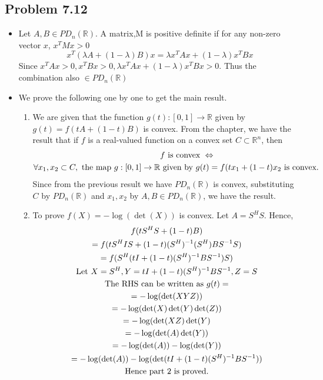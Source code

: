 \documentclass[letterpaper,12pt]{article}
\theoremstyle{definition}
\begin{document}
\subsection*{Problem 7.12}
\begin{itemize}
    \item Let $ A,B \in PD_n(\mathbb{R})$. A matrix,M is positive definite if for any non-zero vector $x$, $ x^TMx>0 $
    \begin{equation*}
        x^T(\lambda A + (1-\lambda)B)x = \lambda x^TAx + (1-\lambda)x^TBx
    \end{equation*}
    Since $x^TAx > 0, x^TBx >0, \lambda x^TAx + (1-\lambda)x^TBx > 0 $. Thus the combination also $\in PD_n(\mathbb{R})$
    
    \item We prove the following one by one to get the main result.
    \begin{enumerate}
    \item We are given that the function $g(t): [0,1] \rightarrow \mathbb{R}$ given by $g(t) = f(tA + (1-t)B)$ is convex. 
    From the chapter, we have the result that if $f$ is a real-valued function on a convex set $C \subset \mathbb{R}^n$, then
    \begin{align*}
        &f \textnormal{ is convex } \Leftrightarrow \\
        \forall x_1, x_2 \subset C, \textnormal{ the map } g: [0,1] \rightarrow \mathbb{R}&\textnormal{ given by } g(t) = f(tx_1 + (1-t)x_2 \textnormal{ is convex.} \\
    \end{align*}
    Since from the previous result we have $PD_n(\mathbb{R})$ is convex, substituting $C$ by $PD_n(\mathbb{R})$ and $x_1, x_2$ by $A,B \in PD_n(\mathbb{R})$, we have the result.
    
    \item To prove $f(X) = -\log(\det(X))$ is convex.
    Let $A = S^HS$. Hence,
    \begin{multline*}
        f(tS^HS + (1-t)B) \\
    = f(tS^HIS + (1-t)(S^H)^{-1}(S^H)BS^{-1}S)\\
    = f(S^H(tI + (1-t)(S^H)^{-1}BS^{-1})S)\\
    \textnormal{Let } X = S^H, Y = tI + (1-t)(S^H)^{-1}BS^{-1}, Z = S\\
    \textnormal{The RHS can be written as } g(t) =\\
    = -\log(\det(XYZ))\\
    = -\log(\det(X)\det(Y)\det(Z))\\
    = -\log(\det(XZ)\det(Y)\\
    =-\log(\det(A)\det(Y))\\
    =-\log(\det(A)) - \log(\det(Y))\\
    =-\log(\det(A)) - \log(\det(tI + (1-t)(S^H)^{-1}BS^{-1}))\\
    \textnormal{Hence part 2 is proved.}\\
    \end{multline*}
    

\end{enumerate}
\end{itemize}
\end{document}
